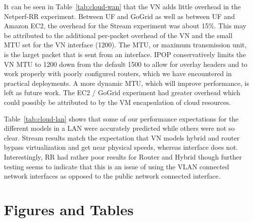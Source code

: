It can be seen in Table~\ref{tab:cloud-wan} that the VN adds little
overhead in the Netperf-RR experiment. Between UF and GoGrid as well as between
UF and Amazon EC2, the overhead for the Stream experiment was about 15\%.  This
may be attributed to the additional per-packet overhead of the VN and the small
MTU set for the VN interface (1200).  The MTU, or maximum transmission unit, is
the larget packet that is sent from an interface.  IPOP conservatively limits
the VN MTU to 1200 down from the default 1500 to allow for overlay headers and
to work properly with poorly configured routers, which we have encountered in
practical deployments.  A more dynamic MTU, which will improve performance, is
left as future work.  The EC2 / GoGrid experiment had greater overhead
which could possibly be attributed to by the VM encapsulation of cloud
resources.

Table~\ref{tab:cloud-lan} shows that some of our performance expectations
for the different models in a LAN were accurately predicted while others
were not so clear.  Stream results match the expectation that VN models hybrid
and router bypass virtualization and get near physical speeds, whereas interface
does not.  Interestingly, RR had rather poor results for Router and Hybrid
though further testing seems to indicate that this is an issue of using the
VLAN connected network interfaces as opposed to the public network connected
interface.

\section{Figures and Tables}

